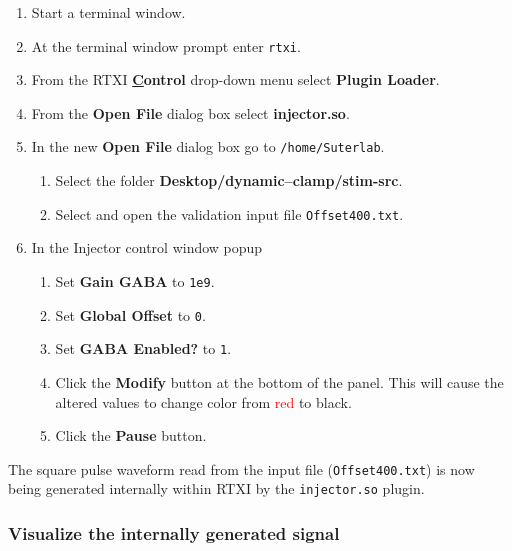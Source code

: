 \documentclass[12pt]{article}
\begin{document}
\begin{enumerate}
	\item Start a terminal window.
	\item At the terminal window prompt enter {\tt rtxi}.
	\item From the RTXI {\bf \underline Control} drop-down menu select {\bf Plugin Loader}.
	\item From the {\bf Open File} dialog box select {\bf injector.so}.
	\item In the new {\bf Open File} dialog box go to {\tt /home/Suterlab}.

	\begin{enumerate}
		\item Select the folder {\bf Desktop/dynamic--clamp/stim-src}.
		\item Select and open the validation input file {\tt Offset400.txt}.
	\end{enumerate}

	\item In the Injector control window popup
	\begin{enumerate}
		\item Set {\bf Gain GABA} to {\tt 1e9}.
		\item Set {\bf Global Offset} to {\tt 0}.
		\item Set {\bf GABA Enabled?} to {\tt 1}.
		\item Click the {\bf Modify} button at the bottom of the panel. This will cause the altered values 
			to change color from \textcolor{red}{red} to black.
		\item Click the {\bf Pause} button.
	\end{enumerate}
\end{enumerate}
The square pulse waveform read from the input file ({\tt Offset400.txt}) is now being generated internally within RTXI by the {\tt injector.so} plugin.

\subsubsection*{Visualize the internally generated signal}
\end{document}
